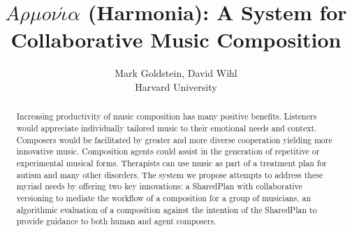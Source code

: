 \documentclass[final,authoryear,5p,times,twocolumn]{elsarticle}
\begin{document}
\begin{frontmatter}



\title{$A \rho \mu o \nu \acute{\iota} \alpha$ (Harmonia): A System for Collaborative Music Composition}


\author{{\rm Mark Goldstein, David Wihl}\\ Harvard University}
\address{\normalsize\{markgoldstein,davidwihl\}@g.harvard.edu}

\begin{abstract}

Increasing productivity of music composition has many positive benefits. Listeners would appreciate individually tailored music to their emotional needs and context. Composers would be facilitated by greater and more diverse cooperation yielding more innovative music. Composition agents could assist in the generation of repetitive or  experimental musical forms. Therapists can use music as part of a treatment plan  for autism and many other disorders. The system we propose attempts to address these myriad needs  by offering two key innovations: a SharedPlan with collaborative versioning to mediate the workflow of a composition for a group of musicians, an algorithmic evaluation of a composition against the intention of the SharedPlan to provide guidance to both human and agent composers.

\end{abstract}

\end{frontmatter}
\end{document}
